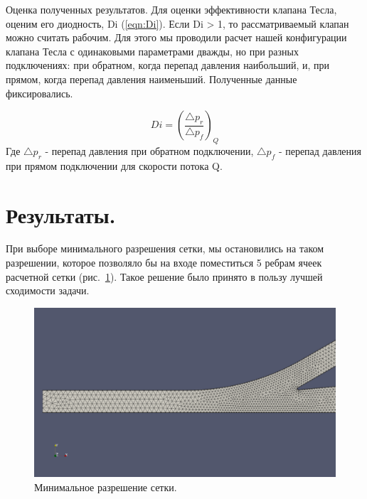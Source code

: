 \documentclass[14pt,a4paper]{article}
\begin{document}
        Оценка полученных результатов. Для оценки эффективности клапана Тесла, оценим его диодность, Di (\ref{eqn:Di}). Если Di > 1, то рассматриваемый клапан можно считать рабочим. Для этого мы проводили расчет нашей конфигурации клапана Тесла с одинаковыми параметрами дважды, но при разных подключениях: при обратном, когда перепад давления наибольший, и, при прямом, когда перепад давления наименьший. Полученные данные фиксировались.         
        
        \begin{equation}\label{eqn:Di}
            Di = (\frac{\bigtriangleup p_{r}}{\bigtriangleup p_{f}})_Q
        \end{equation}
        Где $\bigtriangleup p_{r}$ - перепад давления при обратном подключении, $\bigtriangleup p_{f}$ - перепад давления при прямом подключении для скорости потока Q.
        
        \section*{Результаты.}
        
        При выборе минимального разрешения сетки, мы остановились на таком разрешении, которое позволяло бы на входе поместиться 5 ребрам ячеек расчетной сетки (рис.~\ref{fig:minMesh}). Такое решение было принято в пользу лучшей сходимости задачи.
        
        \begin{figure}[H]
            \centering
            \includegraphics[width = 1\linewidth]{minMesh}
            \caption{Минимальное разрешение сетки.}
            \label{fig:minMesh}
        \end{figure}
    
\end{document}
